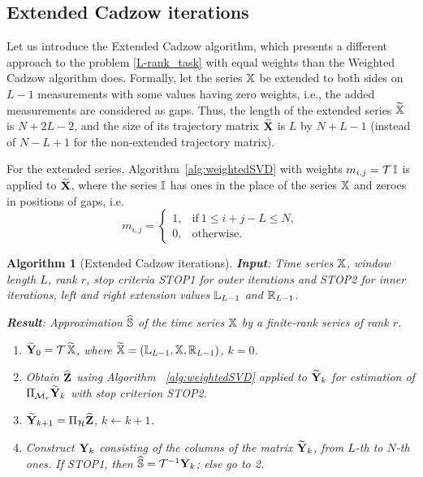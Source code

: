 \documentclass[sii]{ipart}
\newtheorem{algorithm}{Algorithm}
\begin{document}
\subsection{Extended Cadzow iterations}
Let us introduce the Extended Cadzow algorithm, which presents a different approach to the problem \eqref{L-rank_task} with equal weights than the Weighted Cadzow algorithm does.
Formally, let the series $\mathbb{X}$ be extended to both sides on $L-1$ measurements with some values having zero weights, i.e., the added measurements are considered as gaps.
Thus, the length of the extended series $\widetilde{\mathbb{X}}$ is $N+2L-2$, and the size of its trajectory matrix $\widetilde{\mathbf{X}}$ is $L$ by $N+L-1$ (instead of $N-L+1$ for the non-extended trajectory matrix).

For the extended series, Algorithm~\ref{alg:weightedSVD} with weights $m_{i,j}=\mathcal{T}\, \mathbb{I}$ is applied to $\widetilde{\mathbf{X}}$, where the series $\mathbb{I}$ has ones in the place of the series $\mathbb{X}$ and zeroes in positions of gaps, i.e.
\begin{equation*}
m_{i,j} = \begin{cases}
1, & \text{if}\ 1 \le i+j-L \le N, \\
0, & \text{otherwise.}
\end{cases}
\end{equation*}

\begin{algorithm}[Extended Cadzow iterations]\label{alg:ECIt}
	\textbf{Input}: Time series $\mathbb{X}$, window length $L$, rank $r$,
	stop criteria STOP1 for outer iterations and STOP2 for inner iterations,
	left and right extension values $\mathbb{L}_{L-1}$ and $\mathbb{R}_{L-1}$.
	
	\textbf{Result}:
	Approximation $\widehat{\mathbb{S}}$ of the time series $\mathbb{X}$ by a finite-rank series of rank $r$.
	
	\begin{enumerate}
		\item
		$\widetilde{\mathbf{Y}}_0 = \mathcal{T}\, \widetilde{\mathbb{X}}$, where $\widetilde{\mathbb{X}}=(\mathbb{L}_{L-1}, \mathbb{X}, \mathbb{R}_{L-1})$, $k=0$.
		\item
		Obtain $\widehat{\mathbf{Z}}$ using Algorithm ~\ref{alg:weightedSVD} applied to $\widetilde{\mathbf{Y}}_k$ for estimation of $\Pi_{\mathcal{M}_r} \widetilde{\mathbf{Y}}_{k}$ with stop criterion STOP2.
		\item
		$\widetilde{\mathbf{Y}}_{k+1} = \Pi_{\mathcal{H}}  \widehat{\mathbf{Z}}$, $k\leftarrow k+1$.
		\item
		Construct $\mathbf{Y}_k$ consisting of the columns of the matrix $\widetilde{\mathbf{Y}}_{k}$, from $L$-th to $N$-th ones. If STOP1, then $\widehat{\mathbb{S}} = \mathcal{T}^{-1} \mathbf{Y}_k$; else go to 2.
	\end{enumerate}
\end{algorithm}
\end{document}
